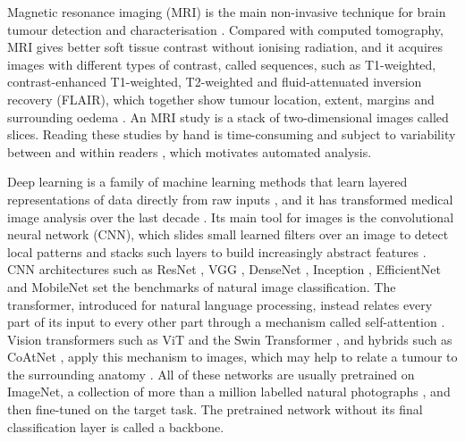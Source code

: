 \documentclass[a4paper,fleqn]{cas-sc}
\begin{document}
Magnetic resonance imaging (MRI) is the main non-invasive technique for brain tumour detection and characterisation \citep{villanueva2017}. Compared with computed tomography, MRI gives better soft tissue contrast without ionising radiation, and it acquires images with different types of contrast, called sequences, such as T1-weighted, contrast-enhanced T1-weighted, T2-weighted and fluid-attenuated inversion recovery (FLAIR), which together show tumour location, extent, margins and surrounding oedema \citep{villanueva2017}. An MRI study is a stack of two-dimensional images called slices. Reading these studies by hand is time-consuming and subject to variability between and within readers \citep{bauer2013}, which motivates automated analysis.

Deep learning is a family of machine learning methods that learn layered representations of data directly from raw inputs \citep{lecun2015}, and it has transformed medical image analysis over the last decade \citep{litjens2017}. Its main tool for images is the convolutional neural network (CNN), which slides small learned filters over an image to detect local patterns and stacks such layers to build increasingly abstract features \citep{lecun1998}. CNN architectures such as ResNet \citep{he2016}, VGG \citep{simonyan2015}, DenseNet \citep{huang2017}, Inception \citep{szegedy2016}, EfficientNet \citep{tan2019} and MobileNet \citep{howard2019} set the benchmarks of natural image classification. The transformer, introduced for natural language processing, instead relates every part of its input to every other part through a mechanism called self-attention \citep{vaswani2017}. Vision transformers such as ViT \citep{dosovitskiy2021} and the Swin Transformer \citep{liu2021}, and hybrids such as CoAtNet \citep{dai2021}, apply this mechanism to images, which may help to relate a tumour to the surrounding anatomy \citep{khan2022,shamshad2023}. All of these networks are usually pretrained on ImageNet, a collection of more than a million labelled natural photographs \citep{deng2009,russakovsky2015}, and then fine-tuned on the target task. The pretrained network without its final classification layer is called a backbone.
\end{document}
